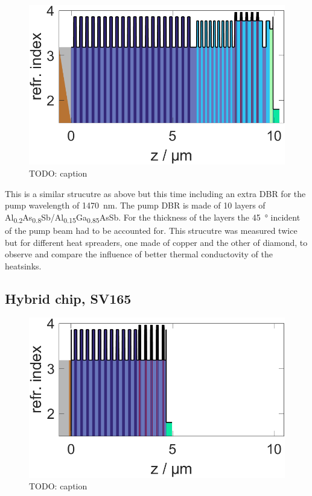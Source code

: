 \begin{figure}
    \vspace{-\baselineskip}
    \centering
    \includegraphics[width=.98\textwidth]{images/1SV167B.lay.png}
    \caption{TODO: caption}
    \label{fig:sv167}
\end{figure}

This is a similar strucutre as above but this time including an extra DBR for the pump wavelength of \qty{1470}{\nm}. The pump DBR is made of 10 layers of Al\textsubscript{0.2}As\textsubscript{0.8}Sb/Al\textsubscript{0.15}Ga\textsubscript{0.85}AsSb. For the thickness of the layers the \qty{45}{\degree} incident of the pump beam had to be accounted for. This strucutre was measured twice but for different heat spreaders, one made of copper and the other of diamond, to observe and compare the influence of better thermal conductovity of the heatsinks.


\subsection*{Hybrid chip, SV165}

\begin{figure}
    \vspace{-\baselineskip}
    \centering
    \includegraphics[width=.98\textwidth]{images/1SV165.lay.png}
    \caption{TODO: caption}
    \label{fig:sv165}
\end{figure}

